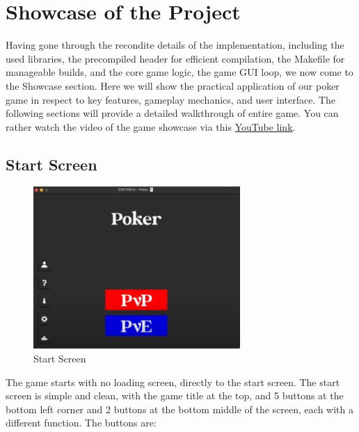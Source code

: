 \section{Showcase of the Project}
\label{sec:showcase-of-the-project}

\hspace{1cm} Having gone through the recondite details of the implementation, including the used libraries, the precompiled header for efficient compilation, the Makefile for manageable builds, and the core game logic, the game GUI loop, we now come to the Showcase section. Here we will show the practical application of our poker game in respect to key features, gameplay mechanics, and user interface. The following sections will provide a detailed walkthrough of entire game. You can rather watch the video of the game showcase via this \href{https://youtu.be/OA0v6xG21N4}{YouTube link}.

\subsection{Start Screen}

\begin{figure}[H]
    \centering
    \includegraphics[width=0.7\textwidth]{figures/start_screen.png}
    \caption{Start Screen}
    \label{fig:start-screen}
\end{figure}

\hspace{1cm} The game starts with no loading screen, directly to the start screen. The start screen is simple and clean, with the game title at the top, and 5 buttons at the bottom left corner and 2 buttons at the bottom middle of the screen, each with a different function. The buttons are: 

